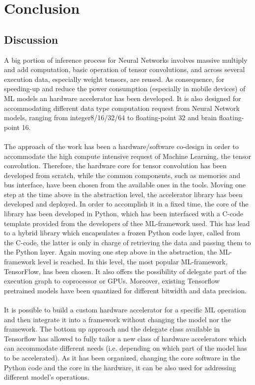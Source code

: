 \chapter{Conclusion}

\section{Discussion}A big portion of inference process for Neural Networks involves massive multiply and add computation, basic operation of tensor convolutions, and across several execution data, especially weight tensors, are reused.
As consequence, for speeding-up and reduce the power consumption (especially in mobile devices) of ML models an hardware accelerator has been developed.
It is also designed for accommodating different data type computation request from Neural Network models, ranging from integer8/16/32/64 to floating-point 32 and brain floating-point 16.\\\\

The approach of the work has been a hardware/software co-design in order to accommodate the high compute intensive request of Machine Learning, the tensor convolution. Therefore, the hardware core for tensor convolution has been developed from scratch, while the common components, such as memories and bus interface, have been chosen from the available ones in the tools.
Moving one step at the time above in the abstraction level, the accelerator library has been developed and deployed. In order to accomplish it in a fixed time, the core of the library has been developed in Python, which has been interfaced with a C-code template provided from the developers of thee ML-framework used. This has lead to a hybrid library which encapsulates a frozen Python code layer, called from the C-code, the latter is only in charge of retrieving the data and passing them to the Python layer.
Again moving one step above in the abstraction, the ML-framework level is reached. In this level, the most popular ML-framework, TensorFlow, has been chosen. It also offers the possibility of delegate part of the execution graph to coprocessor or GPUs. Moreover, existing Tensorflow pretrained models have been quantized for different bitwidth and data precision.\\\\

It is possible to build a custom hardware accelerator for a specific ML operation and then integrate it into a framework without changing the model nor the framework.
The bottom up approach and the delegate class available in Tensorflow has allowed to fully tailor a new class of hardware accelerators which can accommodate different needs (i.e. depending on which part of the model has to be accelerated). As it has been organized, changing the core software in the Python code and the core in the hardware, it can be also used for addressing different model's operations.

